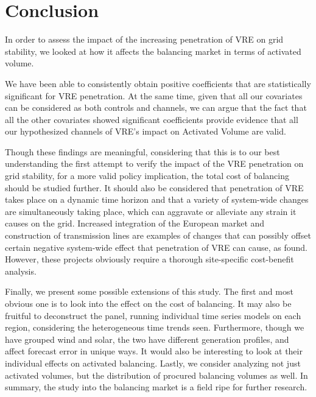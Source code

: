 \documentclass[12pt]{article}
\begin{document}
\section{Conclusion}
\label{section:Conclusion}
In order to assess the impact of the increasing penetration of VRE on grid stability, we looked at how it affects the balancing market in terms of activated volume.\par
We have been able to consistently obtain positive coefficients that are statistically significant for VRE penetration. At the same time, given that all our covariates can be considered as both controls and channels, we can argue that the fact that all the other covariates showed significant coefficients provide evidence that all our hypothesized channels of VRE's impact on Activated Volume are valid.\par
Though these findings are meaningful, considering that this is to our best understanding the first attempt to verify the impact of the VRE penetration on grid stability, for a more valid policy implication, the total cost of balancing should be studied further. It should also be considered that penetration of VRE takes place on a dynamic time horizon and that a variety of system-wide changes are simultaneously taking place, which can aggravate or alleviate any strain it causes on the grid. Increased integration of the European market and construction of transmission lines are examples of changes that can possibly offset certain negative system-wide effect that penetration of VRE can cause, as \citet{Ocker2017} found. However, these projects obviously require a thorough site-specific cost-benefit analysis.  \par
Finally, we present some possible extensions of this study. The first and most obvious one is to look into the effect on the cost of balancing. It may also be fruitful to deconstruct the panel, running individual time series models on each region, considering the heterogeneous time trends seen. Furthermore, though we have grouped wind and solar, the two have different generation profiles, and affect forecast error in unique ways. It would also be interesting to look at their individual effects on activated balancing. Lastly, we consider analyzing not just activated volumes, but the distribution of procured balancing volumes as well. In summary, the study into the balancing market is a field ripe for further research. 
\par
\end{document}
